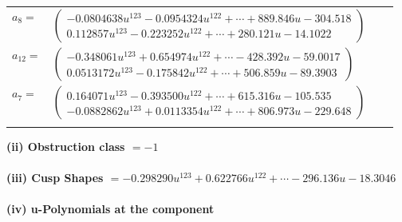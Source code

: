 \documentclass[1p]{elsarticle_modified}
\theoremstyle{definition}
\begin{document}
\begin{tabular}{m{7pt} m{180pt} m{7pt} m{180pt} }
\flushright $a_{8}=$&$\begin{pmatrix}-0.0804638 u^{123}-0.0954324 u^{122}+\cdots+889.846 u-304.518\\0.112857 u^{123}-0.223252 u^{122}+\cdots+280.121 u-14.1022\end{pmatrix}$ \\
\flushright $a_{12}=$&$\begin{pmatrix}-0.348061 u^{123}+0.654974 u^{122}+\cdots-428.392 u-59.0017\\0.0513172 u^{123}-0.175842 u^{122}+\cdots+506.859 u-89.3903\end{pmatrix}$ \\
\flushright $a_{7}=$&$\begin{pmatrix}0.164071 u^{123}-0.393500 u^{122}+\cdots+615.316 u-105.535\\-0.0882862 u^{123}+0.0113354 u^{122}+\cdots+806.973 u-229.648\end{pmatrix}$\\&\end{tabular}
\flushleft \textbf{(ii) Obstruction class $= -1$}\\~\\
\flushleft \textbf{(iii) Cusp Shapes $= -0.298290 u^{123}+0.622766 u^{122}+\cdots-296.136 u-18.3046$}\\~\\
\newpage\renewcommand{\arraystretch}{1}
\flushleft \textbf{(iv) u-Polynomials at the component}\newline \\
\end{document}
